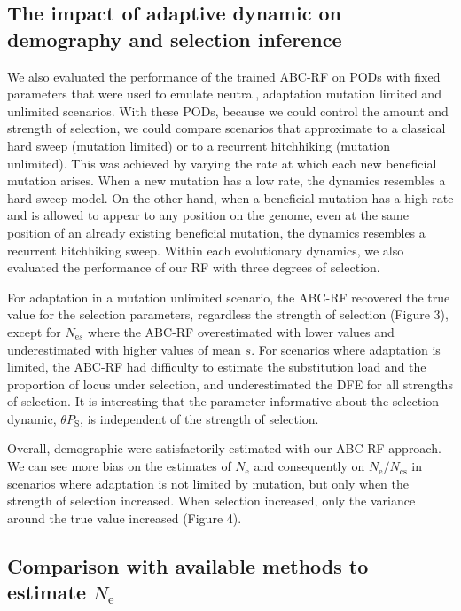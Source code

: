 \documentclass[a4paper, 12pt]{article}
\begin{document}
\subsection*{The impact of adaptive dynamic on demography and selection inference}

We also evaluated the performance of the trained ABC-RF on PODs with fixed parameters that were used to emulate neutral, adaptation mutation limited and unlimited scenarios. With these  PODs, because we could control the amount and strength of selection, we could compare scenarios that approximate to a classical hard sweep (mutation limited) or to a recurrent hitchhiking (mutation unlimited). This was achieved by varying the rate at which each new beneficial mutation arises. When a new mutation has a low rate, the dynamics resembles a hard sweep model. On the other hand, when a beneficial mutation has a high rate and is allowed to appear to any position on the genome, even at the same position of an already existing beneficial mutation, the dynamics resembles a recurrent hitchhiking sweep. Within each evolutionary dynamics, we also evaluated the performance of our RF with three degrees of selection.

For adaptation in a mutation unlimited scenario, the ABC-RF recovered the true value for the selection parameters, regardless the strength of selection (Figure 3), except for $N_{\mathrm{e}s}$ where the ABC-RF overestimated with lower values and underestimated with higher values of mean $s$. For scenarios where adaptation is limited, the ABC-RF had difficulty to estimate the substitution load and the proportion of locus under selection, and underestimated the DFE for all strengths of selection. It is interesting that the parameter informative about the selection dynamic, $\theta P_{\mathrm{S}}$, is independent of the strength of selection. 

Overall, demographic were satisfactorily estimated with our ABC-RF approach. We can see more bias on the estimates of $N_{\mathrm{e}}$ and consequently on $N_{\mathrm{e}}/N_{\mathrm{cs}}$ in scenarios where adaptation is not limited by mutation, but only when the strength of selection increased. When selection increased, only the variance around the true value increased (Figure 4).  

\subsection*{Comparison with available methods to estimate $N_{\mathrm{e}}$}
\end{document}
